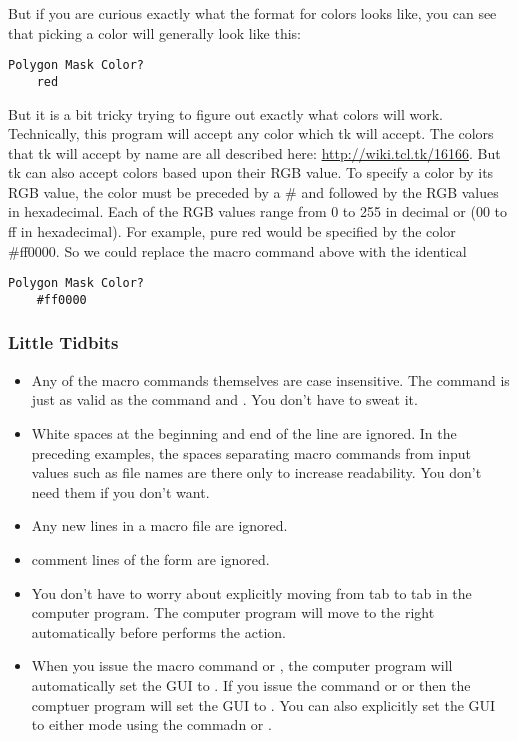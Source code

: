But if you are curious exactly what the format for
colors looks like, you can see that picking a color
will generally look like this:
\begin{lstlisting}[caption={'Use the Folder Syntax'}]
Polygon Mask Color?
    red
\end{lstlisting}
But it is a bit tricky trying to figure out exactly what 
colors will work. Technically, this program will accept 
any color which tk will accept. The colors that tk
will accept by name are all described here:
\url{http://wiki.tcl.tk/16166}. But tk can also accept
colors based upon their RGB value. To specify a color
by its RGB value, the color must be preceded by a \#
and followed by the RGB values in hexadecimal.
Each of the RGB values range from 0 to 255 in
decimal or (00 to ff in hexadecimal).
For example, pure red would be specified by the color
\#ff0000. So we could replace the macro command above
with the identical
\begin{lstlisting}[caption={'Use the Folder Syntax'}]
Polygon Mask Color?
    #ff0000
\end{lstlisting}
     
\subsubsection{Little Tidbits}\label{Little Tidbits}
\begin{itemize}
\item Any of the macro commands themselves are case
insensitive. The command  
is just as valid as the command 
 and 
. You don't have to sweat it. 
\item White spaces at the beginning and end of the 
line are ignored. In the preceding examples, the
spaces separating macro commands from input values
such as file names are there only to increase 
readability. You don't need them if you don't 
want.
\item Any new lines in a macro file are ignored.
\item comment lines of the form 
 are ignored.
\item You don't have to worry about explicitly moving 
from tab to tab in the computer program. The computer 
program will move to the right automatically before
performs the action.
\item When you issue the macro command  
or , the computer program will
automatically set the GUI to .
If you issue the command or  or
 then the comptuer program
will set the GUI to . You
can also explicitly set the GUI to either mode using
the commadn  or
.
\end{itemize}


